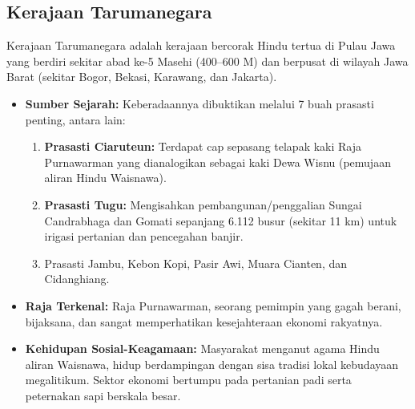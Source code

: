 \documentclass[12pt, a4paper]{article}
\begin{document}
\subsection{Kerajaan Tarumanegara}
Kerajaan Tarumanegara adalah kerajaan bercorak Hindu tertua di Pulau Jawa yang berdiri sekitar abad ke-5 Masehi (400--600 M) dan berpusat di wilayah Jawa Barat (sekitar Bogor, Bekasi, Karawang, dan Jakarta).
\begin{itemize}
	\item \textbf{Sumber Sejarah:} Keberadaannya dibuktikan melalui 7 buah prasasti penting, antara lain:
		\begin{enumerate}
			\item \textbf{Prasasti Ciaruteun:} Terdapat cap sepasang telapak kaki Raja Purnawarman yang dianalogikan sebagai kaki Dewa Wisnu (pemujaan aliran Hindu Waisnawa).
			\item \textbf{Prasasti Tugu:} Mengisahkan pembangunan/penggalian Sungai Candrabhaga dan Gomati sepanjang 6.112 busur (sekitar 11 km) untuk irigasi pertanian dan pencegahan banjir.
			\item Prasasti Jambu, Kebon Kopi, Pasir Awi, Muara Cianten, dan Cidanghiang.
		\end{enumerate}
	\item \textbf{Raja Terkenal:} Raja Purnawarman, seorang pemimpin yang gagah berani, bijaksana, dan sangat memperhatikan kesejahteraan ekonomi rakyatnya.
	\item \textbf{Kehidupan Sosial-Keagamaan:} Masyarakat menganut agama Hindu aliran Waisnawa, hidup berdampingan dengan sisa tradisi lokal kebudayaan megalitikum. Sektor ekonomi bertumpu pada pertanian padi serta peternakan sapi berskala besar.
\end{itemize}
\end{document}
